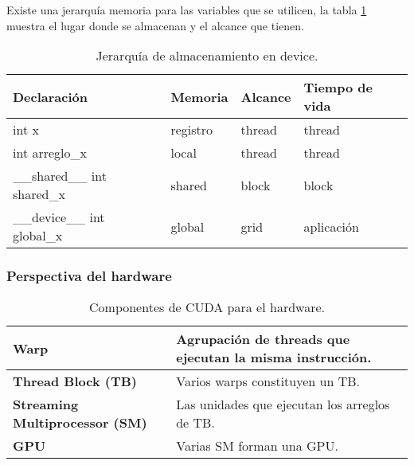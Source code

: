     Existe una jerarquía memoria para las variables que se utilicen, la tabla \ref{tab:memoriaCUDA} muestra el lugar donde se almacenan y el alcance que tienen.
    
         \begin{table}[h!]
         \footnotesize
      \begin{center}
        \begin{tabular}{|m{4.6cm}|m{2.6cm}|m{2.6cm}|m{3cm}|}
         \hline
         \cellcolor{lightgray}\textbf{Declaración} & 
         \cellcolor{lightgray}\textbf{Memoria} &
         \cellcolor{lightgray}\textbf{Alcance} &
         \cellcolor{lightgray}\textbf{Tiempo de vida}\\ 
         \hline
        int x & registro & thread & thread\\ 
         \hline
        int arreglo\_x & local & thread & thread\\ 
         \hline
        \_\_shared\_\_ int shared\_x & shared & block & block\\ 
         \hline
        \_\_device\_\_ int global\_x & global & grid & aplicación\\ 
         \hline
           \end{tabular}
        \caption{Jerarquía de almacenamiento en device.}
        \label{tab:memoriaCUDA}
      \end{center}
    \end{table}
    
    \subsubsection{Perspectiva del hardware}
    
     \begin{table}[h!]
      \begin{center}
            \footnotesize
        \begin{tabular}{|m{3cm}|m{6cm}|}
         \hline
         \cellcolor{lightgray}\textbf{Warp} & Agrupación de threads que ejecutan la misma instrucción. \\ 
         \hline
          \cellcolor{lightgray}\textbf{Thread Block (TB)} & Varios warps constituyen un TB.\\ 
         \hline  
         \cellcolor{lightgray}\textbf{Streaming Multiprocessor (SM)} & Las unidades que ejecutan los arreglos de TB.\\ 
         \hline
         \cellcolor{lightgray}\textbf{GPU} & Varias SM forman una GPU.\\ 
         \hline
           \end{tabular}
        \caption{Componentes de CUDA para el hardware.}
        \label{tab:CUDAcompHW}
      \end{center}
    \end{table}
    
